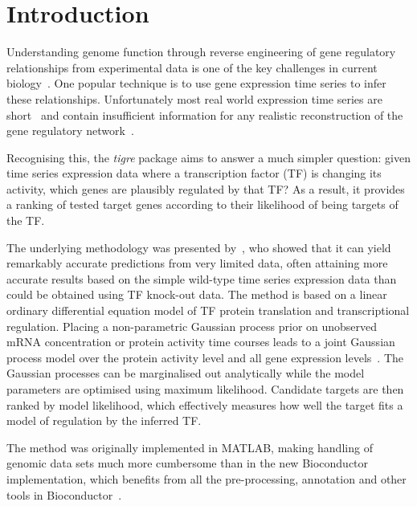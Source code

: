 \documentclass{bioinfo}
\newcommand{\tigre}{\emph{tigre}}
\begin{document}
\section{Introduction}

Understanding genome function through reverse engineering of gene
regulatory relationships from experimental data is one of the key
challenges in current biology~\citep{Bansal2007a,Bickel2009e}.  One
popular technique is to use gene expression time series to infer these
relationships.  Unfortunately most real world expression time series
are short~\citep{Ernst2005} and contain insufficient information for
any realistic reconstruction of the gene regulatory
network~\citep{Smet2010}.

Recognising this, the \tigre{} package aims to answer a much
simpler question: given time series expression data where a
transcription factor (TF) is changing its activity, which genes are
plausibly regulated by that TF?  As a result, it provides a ranking of
tested target genes according to their likelihood of being targets of
the TF.

The underlying methodology was presented by~\citet{Honkela2010PNAS},
who showed that it can yield remarkably accurate predictions from very
limited data, often attaining more accurate results based on the
simple wild-type time series expression data than could be obtained using
TF knock-out data.  The method is based on a linear ordinary
differential equation model of TF protein translation and
transcriptional regulation.  Placing a non-parametric Gaussian process
prior on unobserved mRNA concentration or protein activity time courses
leads to a
joint Gaussian process model over the protein activity level and all
gene expression levels~\citep{Gao2008}.  The Gaussian processes can be
marginalised out analytically while the model parameters are optimised
using maximum likelihood.  Candidate targets are then ranked by model
likelihood, which effectively measures how well the target fits a
model of regulation by the inferred TF.

The method was originally implemented in MATLAB,
making handling of genomic data sets much more cumbersome than in the
new Bioconductor implementation, which benefits from all the
pre-processing, annotation and other tools in
Bioconductor~\citep{Gentleman2004}.

\end{document}
